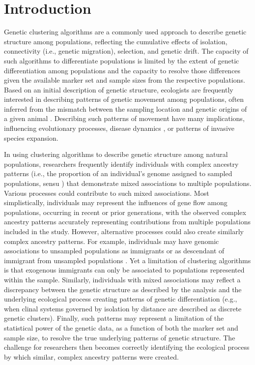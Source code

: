 
\section*{Introduction}

Genetic clustering algorithms are a commonly used approach to describe genetic structure among populations, reflecting the cumulative effects of isolation, connectivity (i.e., genetic migration), selection, and genetic drift.  The capacity of such algorithms to differentiate populations is limited by the extent of genetic differentiation among populations and the capacity to resolve those differences given the available marker set and sample sizes from the respective populations.  Based on an initial description of genetic structure, ecologists are frequently interested in describing patterns of genetic movement among populations, often inferred from the mismatch between the sampling location and genetic origins of a given animal \citep{paetkau1995microsatellite,wilson2003bayesian}.  Describing such patterns of movement have many implications, influencing evolutionary processes, disease dynamics \citep{huestis2019windborne}, or patterns of invasive species expansion.

	In using clustering algorithms to describe genetic structure among natural populations, researchers frequently identify individuals with complex ancestry patterns (i.e., the proportion of an individual’s genome assigned to sampled populations, sensu \citealt{pritchard2000inference}) that demonstrate mixed associations to multiple populations.  Various processes could contribute to such mixed associations.  Most simplistically, individuals may represent the influences of gene flow among populations, occurring in recent or prior generations, with the observed complex ancestry patterns accurately representing contributions from multiple populations included in the study.  However, alternative processes could also create similarly complex ancestry patterns.  For example, individuals may have genomic associations to unsampled populations as immigrants or as descendant of immigrant from unsampled populations \citep{pritchard2000inference,beerli2004effect}.  Yet a limitation of clustering algorithms is that exogenous immigrants can only be associated to populations represented within the sample.  Similarly, individuals with mixed associations may reflect a discrepancy between the genetic structure as described by the analysis and the underlying ecological process creating patterns of genetic differentiation (e.g., when clinal systems governed by isolation by distance are described as discrete genetic clusters).  Finally, such patterns may represent a limitation of the statistical power of the genetic data, as a function of both the marker set and sample size, to resolve the true underlying patterns of genetic structure.  The challenge for researchers then becomes correctly identifying the ecological process by which similar, complex ancestry patterns were created.  
	
